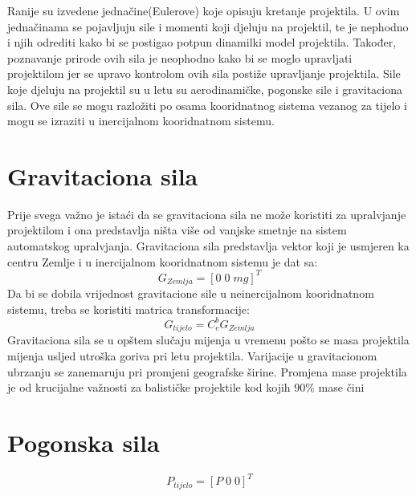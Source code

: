 Ranije su izvedene jednačine(Eulerove) koje opisuju kretanje projektila. U ovim jednačinama se 
pojavljuju sile i momenti koji djeluju na projektil, te je nephodno i njih odrediti kako bi 
se postigao potpun dinamilki model projektila. Također, poznavanje prirode ovih sila je neophodno kako 
bi se moglo upravljati projektilom jer se upravo kontrolom ovih sila postiže upravljanje projektila.
Sile koje djeluju na projektil su u letu su aerodinamičke, pogonske sile i 
gravitaciona sila. Ove sile se mogu razložiti po osama kooridnatnog sistema vezanog 
za tijelo i mogu se izraziti u inercijalnom kooridnatnom sistemu. 
\section{Gravitaciona sila}
Prije svega važno je istaći da se gravitaciona sila ne može koristiti za upralvjanje projektilom i 
ona predstavlja ništa više od vanjske smetnje na sistem automatskog upralvjanja.
Gravitaciona sila predstavlja vektor koji je usmjeren ka centru Zemlje i u inercijalnom kooridnatnom
sistemu je dat sa:
\begin{equation}
    G_{Zemlja}=[0\;  0\;  mg]^T
\end{equation}
Da bi se dobila vrijednost gravitacione sile u neinercijalnom kooridnatnom sistemu, treba se koristiti matrica 
transformacije:
\begin{equation}
    G_{tijelo} = C_e^bG_{Zemlja}
\end{equation}
Gravitaciona sila se u opštem slučaju mijenja u vremenu pošto se masa projektila mijenja usljed utroška goriva
pri letu projektila. Varijacije u gravitacionom ubrzanju se zanemaruju pri promjeni geografske širine.  
Promjena mase projektila je od krucijalne važnosti za balističke projektile kod kojih $90\%$ mase čini 
\section{Pogonska sila}
\begin{equation}
    P_{tijelo}=[P\;  0\;  0]^T
\end{equation}
